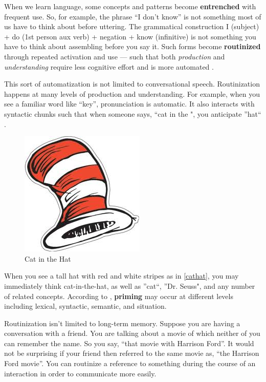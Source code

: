 When we learn language, some concepts and patterns become \textbf{entrenched} with frequent use. So, for example, the phrase ``I don't know'' is not something most of us have to think about before uttering. The grammatical construction I (subject) + do (1st person aux verb) + negation + know (infinitive) is not something you have to think about assembling before you say it. Such forms become \textbf{routinized} through repeated activation and use --- such that both \emph{production} and \emph{understanding} require less cognitive effort and is more automated  \citep{Pickering:2003uy}. 

This sort of automatization is not limited to conversational speech. Routinization happens at many levels of production and understanding. For example, when you see a familiar word like ``key'', pronunciation is automatic. It also interacts with syntactic chunks such that when someone says, ``cat in the  \underline{   }",  you anticipate ''hat``  \citep{Pickering:2003uy}. \\

\begin{figure}
\centerline{
\includegraphics[scale=.5]{chapter8.tex/cathat}
}
\caption{Cat in the Hat}
\label{cathat}
\end{figure}

When you see a tall hat with red and white stripes as in  \autoref{cathat},  you may immediately think cat-in-the-hat, as well as ''cat``, ''Dr. Seuss", and any number of related concepts. According to  \citep{Pickering:2003uy},  \textbf{priming} may occur at different levels including lexical, syntactic, semantic, and situation. 

Routinization isn't limited to long-term memory. Suppose you are having a conversation with a friend. You are talking about a movie of which neither of you can remember the name. So you say, ``that movie with Harrison Ford''. It would not be surprising if your friend then referred to the same movie as, ``the Harrison Ford movie''. You can routinize a reference to something during the course of an interaction in order to communicate more easily.

